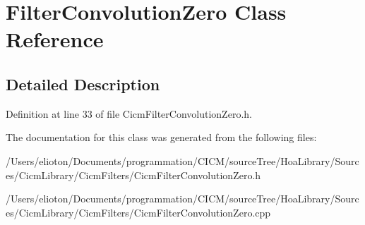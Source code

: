 \hypertarget{class_filter_convolution_zero}{\section{Filter\-Convolution\-Zero Class Reference}
\label{class_filter_convolution_zero}
}


\subsection{Detailed Description}


Definition at line 33 of file Cicm\-Filter\-Convolution\-Zero.\-h.



The documentation for this class was generated from the following files\-:\begin{DoxyCompactItemize}
\item 
/\-Users/elioton/\-Documents/programmation/\-C\-I\-C\-M/source\-Tree/\-Hoa\-Library/\-Sources/\-Cicm\-Library/\-Cicm\-Filters/Cicm\-Filter\-Convolution\-Zero.\-h\item 
/\-Users/elioton/\-Documents/programmation/\-C\-I\-C\-M/source\-Tree/\-Hoa\-Library/\-Sources/\-Cicm\-Library/\-Cicm\-Filters/Cicm\-Filter\-Convolution\-Zero.\-cpp\end{DoxyCompactItemize}
